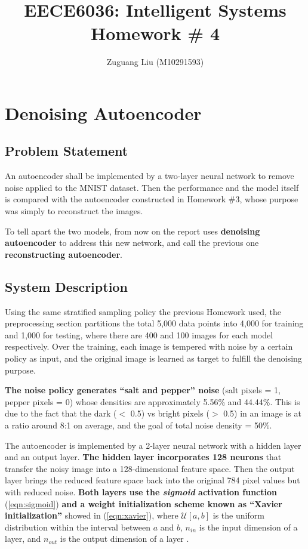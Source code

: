 \documentclass[11pt,titlepage]{article}
\title{EECE6036: Intelligent Systems\\Homework \# 4}
\author{Zuguang Liu (M10291593)}
\begin{document}
\maketitle

\section{Denoising Autoencoder}





\subsection{Problem Statement}

An autoencoder shall be implemented by a two-layer neural network to remove noise applied to the MNIST dataset. Then the performance and the model itself is compared with the autoencoder constructed in Homework \#3, whose purpose was simply to reconstruct the images. 

To tell apart the two models, from now on the report uses \textbf{denoising autoencoder} to address this new network, and call the previous one \textbf{reconstructing autoencoder}.









\subsection{System Description}
Using the same stratified sampling policy the previous Homework used, the preprocessing section partitions the total 5,000 data points into 4,000 for training and 1,000 for testing, where there are 400 and 100 images for each model respectively. Over the training, each image is tempered with noise by a certain policy as input, and the original image is learned as target to fulfill the denoising purpose. 

\textbf{The noise policy generates ``salt and pepper'' noise} (salt pixels = 1, pepper pixels = 0) whose densities are approximately 5.56\% and 44.44\%. This is due to the fact that the dark ($<$ 0.5) vs bright pixels ($>$ 0.5) in an image is at a ratio around 8:1 on average, and the goal of total noise density = 50\%. 

The autoencoder is implemented by a 2-layer neural network with a hidden layer and an output layer. \textbf{The hidden layer incorporates 128 neurons} that transfer the noisy image into a 128-dimensional feature space. Then the output layer brings the reduced feature space back into the original 784 pixel values but with reduced noise. \textbf{Both layers use the \textit{sigmoid} activation function} (\ref{eqn:sigmoid}) \textbf{and a weight initialization scheme known as ``Xavier initialization''} showed in (\ref{eqn:xavier}), where $\mathcal{U}[a,b]$ is the uniform distribution within the interval between $a$ and $b$, $n_{in}$ is the input dimension of a layer, and $n_{out}$ is the output dimension of a layer \cite{glorot_understanding_nodate}.
\end{document}
